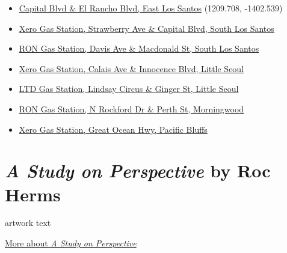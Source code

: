 \documentclass[
  openany]{book}
\providecommand{\tightlist}{%
  \setlength{\itemsep}{0pt}\setlength{\parskip}{0pt}}
\begin{document}
\begin{itemize}
\tightlist
\item
  \href{https://grandtheftdata.com/landmarks/\#513.325,-1374.453,4,hybrid,name=gas_station,Gas_Station,_Capital_Blvd_\&_El_Rancho_Blvd,_East_Los_Santos}{Capital Blvd \& El Rancho Blvd, East Los Santos} (1209.708, -1402.539)
\item
  \href{https://grandtheftdata.com/landmarks/\#513.325,-1374.453,4,hybrid,name=gas_station,Xero_Gas_Station,_Strawberry_Ave_\&_Capital_Blvd,_South_Los_Santos}{Xero Gas Station, Strawberry Ave \& Capital Blvd, South Los Santos}
\item
  \href{https://grandtheftdata.com/landmarks/\#513.325,-1374.453,4,hybrid,name=gas_station,RON_Gas_Station,_Davis_Ave_\&_Macdonald_St,_South_Los_Santos}{RON Gas Station, Davis Ave \& Macdonald St, South Los Santos}
\item
  \href{https://grandtheftdata.com/landmarks/\#513.325,-1374.453,4,hybrid,name=gas_station,Xero_Gas_Station,_Calais_Ave_\&_Innocence_Blvd,_Little_Seoul}{Xero Gas Station, Calais Ave \& Innocence Blvd, Little Seoul}
\item
  \href{https://grandtheftdata.com/landmarks/\#513.325,-1374.453,4,hybrid,name=gas_station,LTD_Gas_Station,_Lindsay_Circus_\&_Ginger_St,_Little_Seoul}{LTD Gas Station, Lindsay Circus \& Ginger St, Little Seoul}
\item
  \href{https://grandtheftdata.com/landmarks/\#-1543.17,-676.107,4,hybrid,name=gas_station,RON_Gas_Station,_N_Rockford_Dr_\&_Perth_St,_Morningwood}{RON Gas Station, N Rockford Dr \& Perth St, Morningwood}
\item
  \href{https://grandtheftdata.com/landmarks/\#-1543.17,-676.107,4,hybrid,name=gas_station,Xero_Gas_Station,_Great_Ocean_Hwy,_Pacific_Bluffs}{Xero Gas Station, Great Ocean Hwy, Pacific Bluffs}
\end{itemize}

\hypertarget{a-study-on-perspective-by-roc-herms}{%
\section*{\texorpdfstring{\emph{A Study on Perspective} by Roc Herms}{A Study on Perspective by Roc Herms}}\label{a-study-on-perspective-by-roc-herms}}

artwork text

\href{https://www.rocherms.com/projects/study-of-perspective/}{More about \emph{A Study on Perspective}}
\end{document}
